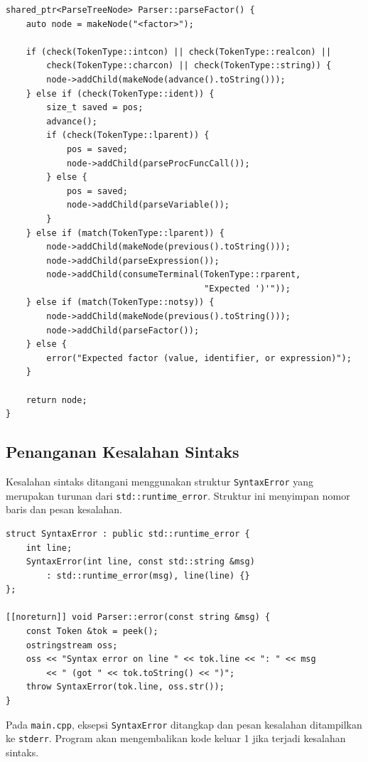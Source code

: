 ﻿\documentclass[12pt,a4paper]{article}
\begin{document}
\begin{lstlisting}[style=cpp, caption={Disambiguasi factor: variable vs function call}]
shared_ptr<ParseTreeNode> Parser::parseFactor() {
    auto node = makeNode("<factor>");

    if (check(TokenType::intcon) || check(TokenType::realcon) ||
        check(TokenType::charcon) || check(TokenType::string)) {
        node->addChild(makeNode(advance().toString()));
    } else if (check(TokenType::ident)) {
        size_t saved = pos;
        advance();
        if (check(TokenType::lparent)) {
            pos = saved;
            node->addChild(parseProcFuncCall());
        } else {
            pos = saved;
            node->addChild(parseVariable());
        }
    } else if (match(TokenType::lparent)) {
        node->addChild(makeNode(previous().toString()));
        node->addChild(parseExpression());
        node->addChild(consumeTerminal(TokenType::rparent,
                                       "Expected ')'"));
    } else if (match(TokenType::notsy)) {
        node->addChild(makeNode(previous().toString()));
        node->addChild(parseFactor());
    } else {
        error("Expected factor (value, identifier, or expression)");
    }

    return node;
}
\end{lstlisting}

\subsection{Penanganan Kesalahan Sintaks}

Kesalahan sintaks ditangani menggunakan struktur \texttt{SyntaxError} yang merupakan turunan dari \texttt{std::runtime\_error}. Struktur ini menyimpan nomor baris dan pesan kesalahan.

\begin{lstlisting}[style=cpp, caption={Struktur SyntaxError dan fungsi error}]
struct SyntaxError : public std::runtime_error {
    int line;
    SyntaxError(int line, const std::string &msg)
        : std::runtime_error(msg), line(line) {}
};

[[noreturn]] void Parser::error(const string &msg) {
    const Token &tok = peek();
    ostringstream oss;
    oss << "Syntax error on line " << tok.line << ": " << msg
        << " (got " << tok.toString() << ")";
    throw SyntaxError(tok.line, oss.str());
}
\end{lstlisting}

Pada \texttt{main.cpp}, eksepsi \texttt{SyntaxError} ditangkap dan pesan kesalahan ditampilkan ke \texttt{stderr}. Program akan mengembalikan kode keluar 1 jika terjadi kesalahan sintaks.
\end{document}
